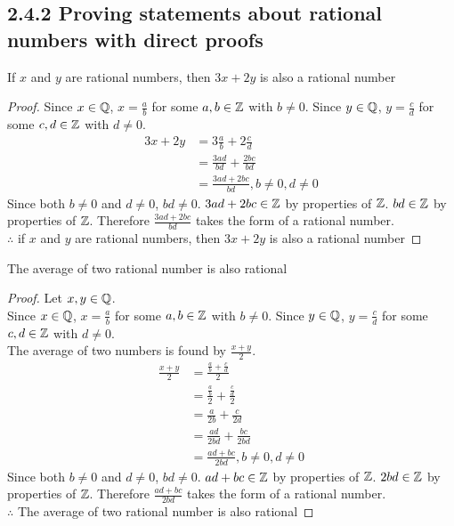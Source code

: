 \subsection*{2.4.2 Proving statements about rational numbers with direct proofs}
\begin{enumerate}
   If $x$ and $y$ are rational numbers, then $3x + 2y$ is also a rational number
  \begin{proof}
    Since $x \in \mathbb{Q}$, $x = \frac{a}{b}$ for some $a,b \in \mathbb{Z}$ with $b \neq 0$.
    Since $y \in \mathbb{Q}$, $y = \frac{c}{d}$ for some $c,d \in \mathbb{Z}$ with $d \neq 0$.
    \begin{align*}
      3x + 2y & = 3\frac{a}{b} + 2\frac{c}{d}              \\
              & = \frac{3ad}{bd} + \frac{2bc}{bd}          \\
              & = \frac{3ad + 2bc}{bd}, b \neq 0, d \neq 0
    \end{align*}
    Since both $b \neq 0$ and $d \neq 0$, $bd \neq 0$. $3ad + 2bc \in \mathbb{Z}$ by properties of $\mathbb{Z}$.
    $bd \in \mathbb{Z}$ by properties of $\mathbb{Z}$. Therefore $\frac{3ad + 2bc}{bd}$ takes the form of a rational number. \\
    $\therefore$ if $x$ and $y$ are rational numbers, then $3x + 2y$ is also a rational number
  \end{proof}
   The average of two rational number is also rational
  \begin{proof}
    Let $x,y \in \mathbb{Q}$. \\
    Since $x \in \mathbb{Q}$, $x = \frac{a}{b}$ for some $a,b \in \mathbb{Z}$ with $b \neq 0$.
    Since $y \in \mathbb{Q}$, $y = \frac{c}{d}$ for some $c,d \in \mathbb{Z}$ with $d \neq 0$. \\
    The average of two numbers is found by $\frac{x + y}{2}$.
    \begin{align*}
      \frac{x+y}{2} & = \frac{\frac{a}{b} + \frac{c}{d}}{2}           \\
                    & = \frac{\frac{a}{b}}{2} + \frac{\frac{c}{d}}{2} \\
                    & = \frac{a}{2b} + \frac{c}{2d}                   \\
                    & = \frac{ad}{2bd} + \frac{bc}{2bd}               \\
                    & = \frac{ad + bc}{2bd}, b \neq 0, d \neq 0
    \end{align*}
    Since both $b \neq 0$ and $d \neq 0$, $bd \neq 0$. $ad + bc \in \mathbb{Z}$ by properties of $\mathbb{Z}$.
    $2bd \in \mathbb{Z}$ by properties of $\mathbb{Z}$. Therefore $\frac{ad + bc}{2bd}$ takes the form of a rational number. \\
    $\therefore$ The average of two rational number is also rational
  \end{proof}
\end{enumerate}

